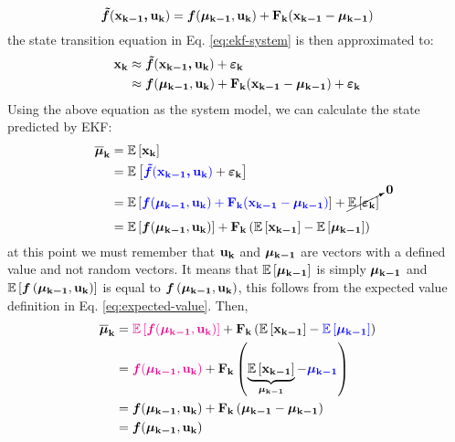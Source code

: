 \documentclass[12pt]{article}
\begin{document}
\begin{equation}
    \mb{\tilde{f}}(\bvec{x_{k-1}, u_k}) = 
    \mb{f}(\bvec{\mu_{k-1}}, \bvec{u_k}) 
    + \mat{F_k} (\bvec{x_{k-1}} - \bvec{\mu_{k-1}})
    \label{eq:linearized-system-model}
\end{equation}
the state transition equation in Eq. \ref{eq:ekf-system} is then 
approximated to:
\begin{equation}
\begin{aligned}
    \boldsymbol{\mathbf{x_k}} &\approx {\boldsymbol{\tilde{f}}}(\boldsymbol{\mathbf{x_{k-1}, u_k}}) 
    + \boldsymbol{\mathbf{\varepsilon_k}}\\
    &\approx {\boldsymbol{f}}(\boldsymbol{\mathbf{\mu_{k-1}}}, \boldsymbol{\mathbf{u_k}}) + \boldsymbol{\mathbf{F_k}} (\boldsymbol{\mathbf{x_{k-1}}} - 
    \boldsymbol{\mathbf{\mu_{k-1}}}) + \boldsymbol{\mathbf{\varepsilon_k}}
\end{aligned}
\end{equation}
Using the above equation as the system model, we can calculate the state
predicted by EKF:
\begin{equation*}
\begin{aligned}
    \boldsymbol{\mathbf{\overline{\mu}_k}} &= \mathbb{E}\left[\boldsymbol{\mathbf{x_k}}\right] \\
    &= \mathbb{E}\left[\color{blue}{\boldsymbol{\tilde{f}}}(\boldsymbol{\mathbf{x_{k-1}, u_k}})\color{black} + {\boldsymbol{\varepsilon}}_\mathbf{k}\right]\\
    &= \mathbb{E}\left[\color{blue}{\boldsymbol{f}}(\boldsymbol{\mathbf{\mu_{k-1}}}, \boldsymbol{\mathbf{u_k}}) + \boldsymbol{\mathbf{F_k}} (\boldsymbol{\mathbf{x_{k-1}}} - \boldsymbol{\mathbf{\mu_{k-1}}})\color{black}\right] + \cancelto{\boldsymbol{\mathbf{0}}}{\mathbb{E}\left[{\boldsymbol{\varepsilon}}_\mathbf{k}\right]} \\
    &= \mathbb{E}\left[{\boldsymbol{f}}(\boldsymbol{\mathbf{\mu_{k-1}}}, \boldsymbol{\mathbf{u_k}})\right] + \boldsymbol{\mathbf{F_k}}\left(\mathbb{E}\left[\boldsymbol{\mathbf{x_{k-1}}}\right] - \mathbb{E}\left[\boldsymbol{\mathbf{\mu_{k-1}}}\right]\right)
\end{aligned}
\end{equation*}
at this point we must remember that $\boldsymbol{\mathbf{u_k}}$ and $\boldsymbol{\mathbf{\mu_{k-1}}}$ 
are vectors with a defined value and not random vectors. It means that 
$\mathbb{E}\left[\boldsymbol{\mathbf{\mu_{k-1}}}\right]$ is simply $\boldsymbol{\mathbf{\mu_{k-1}}}$ and 
$\mathbb{E}\left[{\boldsymbol{f}}\left(\boldsymbol{\mathbf{\mu_{k-1}}}, \boldsymbol{\mathbf{u_k}}\right)\right]$ is equal to ${\boldsymbol{f}}\left(\boldsymbol{\mathbf{\mu_{k-1}}}, \boldsymbol{\mathbf{u_k}}\right)$, this follows from the expected value definition in Eq. \ref{eq:expected-value}. Then,
\begin{equation}
    \begin{aligned}
        \bvec{\overline{\mu}_k} &= \magenta{\expv{\mb{f}(\bvec{\mu_{k-1}}, \bvec{u_k})}} + \mat{F_k}\parentheses{\expv{\bvec{x_{k-1}}} - \blue{\expv{\bvec{\mu_{k-1}}}}}\\
        &= \magenta{\mb{f}(\bvec{\mu_{k-1}}, \bvec{u_k})} + \mat{F_k}\parentheses{\underbrace{\expv{\bvec{x_{k-1}}}}_{\bvec{\mu_{k-1}}} - \blue{\bvec{\mu_{k-1}}}}\\
        &= \mb{f}(\bvec{\mu_{k-1}}, \bvec{u_k}) + \mat{F_k}\parentheses{\bvec{\mu_{k-1}} - \bvec{\mu_{k-1}}}\\
        &= \mb{f}(\bvec{\mu_{k-1}}, \bvec{u_k})
    \end{aligned}
\label{eq:ekf-mean-prediction}
\end{equation}
\end{document}
